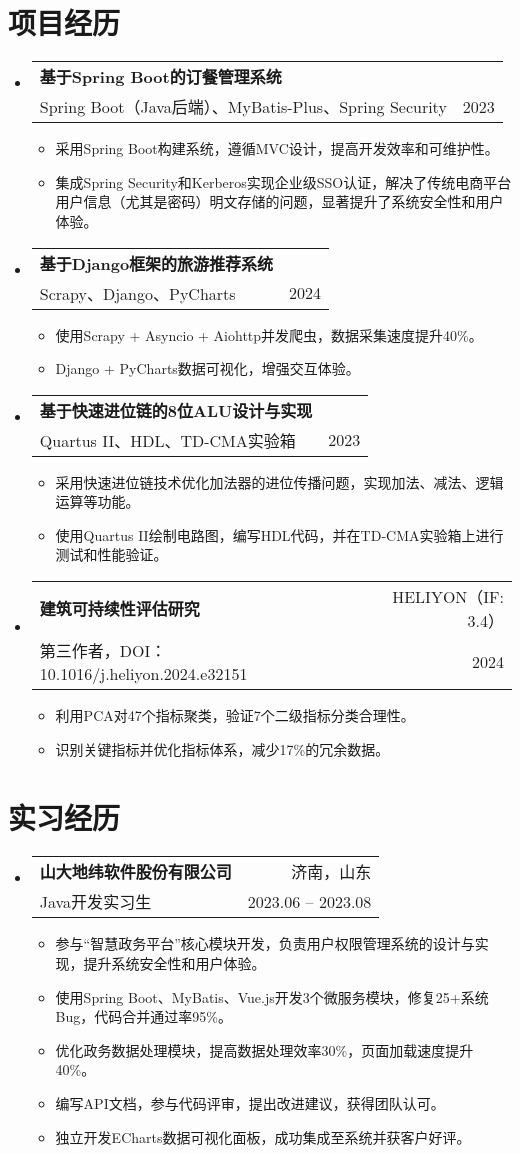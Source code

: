 \documentclass[a4paper,11pt]{ctexart}
\makeatletter
\newenvironment{resumeList}{\begin{itemize}[leftmargin=*,label={}]}{\end{itemize}}
\newcommand{\resumeItem}[1]{\item\small{#1}}
\newcommand{\resumeEntry}[4]{
  \item \begin{tabular*}{0.97\textwidth}[t]{l@{\extracolsep{\fill}}r}
    \textbf{#1} & #2 \\
    #3 & #4 \\
  \end{tabular*}
}
\makeatother
\begin{document}
\section{项目经历}
\begin{resumeList}
    \resumeEntry{基于Spring Boot的订餐管理系统}{}{Spring Boot（Java后端）、MyBatis-Plus、Spring Security}{2023}
    \begin{resumeList}
        \resumeItem{采用Spring Boot构建系统，遵循MVC设计，提高开发效率和可维护性。}
        \resumeItem{集成Spring Security和Kerberos实现企业级SSO认证，解决了传统电商平台用户信息（尤其是密码）明文存储的问题，显著提升了系统安全性和用户体验。}
    \end{resumeList}
    \resumeEntry{基于Django框架的旅游推荐系统}{}{Scrapy、Django、PyCharts}{2024}
    \begin{resumeList}
        \resumeItem{使用Scrapy + Asyncio + Aiohttp并发爬虫，数据采集速度提升40\%。}
        \resumeItem{Django + PyCharts数据可视化，增强交互体验。}
    \end{resumeList}
    \resumeEntry{基于快速进位链的8位ALU设计与实现}{}{Quartus II、HDL、TD-CMA实验箱}{2023}
\begin{resumeList}
    \resumeItem{采用快速进位链技术优化加法器的进位传播问题，实现加法、减法、逻辑运算等功能。}
    \resumeItem{使用Quartus II绘制电路图，编写HDL代码，并在TD-CMA实验箱上进行测试和性能验证。}
\end{resumeList}
    \resumeEntry{建筑可持续性评估研究}{HELIYON（IF: 3.4）}{第三作者，DOI：10.1016/j.heliyon.2024.e32151}{2024}
    \begin{resumeList}
        \resumeItem{利用PCA对47个指标聚类，验证7个二级指标分类合理性。}
        \resumeItem{识别关键指标并优化指标体系，减少17\%的冗余数据。}
    \end{resumeList}
\end{resumeList}

\section{实习经历}
\begin{resumeList}
    \resumeEntry{山大地纬软件股份有限公司}{济南，山东}{Java开发实习生}{2023.06 -- 2023.08}
    \begin{resumeList}
        \resumeItem{参与“智慧政务平台”核心模块开发，负责用户权限管理系统的设计与实现，提升系统安全性和用户体验。}
        \resumeItem{使用Spring Boot、MyBatis、Vue.js开发3个微服务模块，修复25+系统Bug，代码合并通过率95\%。}
        \resumeItem{优化政务数据处理模块，提高数据处理效率30\%，页面加载速度提升40\%。}
        \resumeItem{编写API文档，参与代码评审，提出改进建议，获得团队认可。}
        \resumeItem{独立开发ECharts数据可视化面板，成功集成至系统并获客户好评。}
    \end{resumeList}
\end{resumeList}
\end{document}

